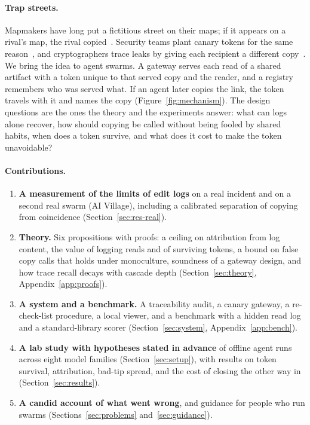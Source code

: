 \paragraph{Trap streets.} Mapmakers have long put a fictitious street on their maps; if it appears on a rival's map, the rival copied~\citep{fictitiousentry}. Security teams plant canary tokens for the same reason~\citep{canarytokens}, and cryptographers trace leaks by giving each recipient a different copy~\citep{chor1994tracing}. We bring the idea to agent swarms. A gateway serves each read of a shared artifact with a token unique to that served copy and the reader, and a registry remembers who was served what. If an agent later copies the link, the token travels with it and names the copy (Figure~\ref{fig:mechanism}). The design questions are the ones the theory and the experiments answer: what can logs alone recover, how should copying be called without being fooled by shared habits, when does a token survive, and what does it cost to make the token unavoidable?

\paragraph{Contributions.}
\begin{enumerate}[leftmargin=1.6em]
  \item \textbf{A measurement of the limits of edit logs} on a real incident and on a second real swarm (AI Village), including a calibrated separation of copying from coincidence (Section~\ref{sec:res-real}).
  \item \textbf{Theory.} Six propositions with proofs: a ceiling on attribution from log content, the value of logging reads and of surviving tokens, a bound on false copy calls that holds under monoculture, soundness of a gateway design, and how trace recall decays with cascade depth (Section~\ref{sec:theory}, Appendix~\ref{app:proofs}).
  \item \textbf{A system and a benchmark.} A traceability audit, a canary gateway, a re-check-list procedure, a local viewer, and a benchmark with a hidden read log and a standard-library scorer (Section~\ref{sec:system}, Appendix~\ref{app:bench}).
  \item \textbf{A lab study with hypotheses stated in advance} of \nRuns{} offline agent runs across eight model families (Section~\ref{sec:setup}), with results on token survival, attribution, bad-tip spread, and the cost of closing the other way in (Section~\ref{sec:results}).
  \item \textbf{A candid account of what went wrong}, and guidance for people who run swarms (Sections~\ref{sec:problems} and~\ref{sec:guidance}).
\end{enumerate}

